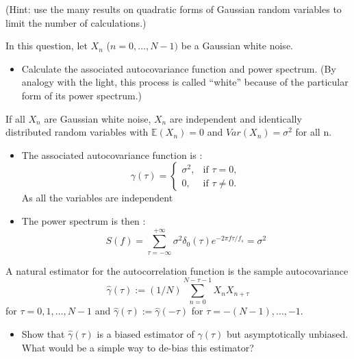 \documentclass[11pt]{article}
\begin{document}
(Hint: use the many results on quadratic forms of Gaussian random variables to limit the number of calculations.)

\begin{exercise}
In this question, let $X_n$ ($n=0,\dots,N-1)$ be a Gaussian white noise.

\begin{itemize}
    \item Calculate the associated autocovariance function and power spectrum. (By analogy with the light, this process is called ``white'' because of the particular form of its power spectrum.)
\end{itemize}

\end{exercise}

\begin{solution}
If all $X_n$ are Gaussian white noise, $X_n$ are independent and identically distributed random variables with $\mathbb{E}(X_n)=0$ and $Var(X_n)=\sigma^2$ for all n.

\begin{itemize}
    \item The associated autocovariance function is :
        \begin{equation}
            \gamma(\tau) = \begin{cases}
                \sigma^2, & \text{if } \tau=0,\\
                0, & \text{if } \tau \neq 0.
            \end{cases}
        \end{equation}
        As all the variables are independent
    \item The power spectrum is then : 
    \begin{equation}
        S(f) = \sum_{\tau=-\infty}^{+\infty}\sigma^2\delta_0(\tau)e^{-2\pi f\tau/f_s}
        =\sigma^2
    \end{equation}
\end{itemize}

\end{solution}


\begin{exercise}
A natural estimator for the autocorrelation function is the sample autocovariance
\begin{equation}
    \hat{\gamma}(\tau) := (1/N) \sum_{n=0}^{N-\tau-1} X_n X_{n+\tau}
\end{equation}
for $\tau=0,1,\dots,N-1$ and $\hat{\gamma}(\tau):=\hat{\gamma}(-\tau)$ for $\tau=-(N-1),\dots,-1$.
\begin{itemize}
    \item Show that $\hat{\gamma}(\tau)$ is a biased estimator of $\gamma(\tau)$ but asymptotically unbiased.
    What would be a simple way to de-bias this estimator?
\end{itemize}

\end{exercise}
\end{document}
